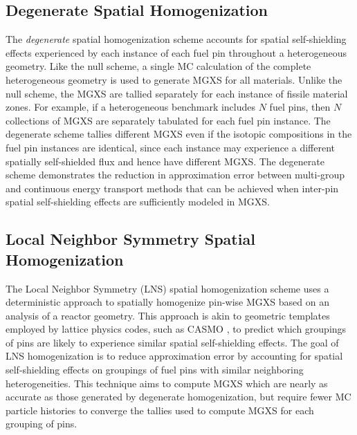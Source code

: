 \subsection{Degenerate Spatial Homogenization}
\label{subsec:homogenize-degenerate}

The \textit{degenerate} spatial homogenization scheme accounts for spatial self-shielding effects experienced by each instance of each fuel pin throughout a heterogeneous geometry. Like the null scheme, a single MC calculation of the complete heterogeneous geometry is used to generate MGXS for all materials. Unlike the null scheme, the MGXS are tallied separately for each instance of fissile material zones. For example, if a heterogeneous benchmark includes $N$ fuel pins, then $N$ collections of MGXS are separately tabulated for each fuel pin instance. The degenerate scheme tallies different MGXS even if the isotopic compositions in the fuel pin instances are identical, since each instance may experience a different spatially self-shielded flux and hence have different MGXS. The degenerate scheme demonstrates the reduction in approximation error between multi-group and continuous energy transport methods that can be achieved when inter-pin spatial self-shielding effects are sufficiently modeled in MGXS.

\subsection{Local Neighbor Symmetry Spatial Homogenization}
\label{subsec:homogenize-lns}

The Local Neighbor Symmetry (LNS) spatial homogenization scheme uses a deterministic approach to spatially homogenize pin-wise MGXS based on an analysis of a reactor geometry. This approach is akin to geometric templates employed by lattice physics codes, such as CASMO \citep{edenius1995casmo}, to predict which groupings of pins are likely to experience similar spatial self-shielding effects. The goal of LNS homogenization is to reduce approximation error by accounting for spatial self-shielding effects on groupings of fuel pins with similar neighboring heterogeneities. This technique aims to compute MGXS which are nearly as accurate as those generated by degenerate homogenization, but require fewer MC particle histories to converge the tallies used to compute MGXS for each grouping of pins.

